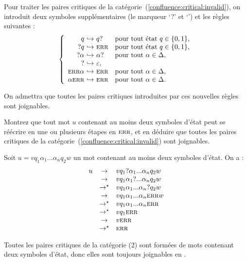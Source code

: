 \begin{exercice}
  Pour traiter les paires critiques de la catégorie~(\ref{confluence:critical:invalid}),
  on introduit deux symboles supplémentaires (le marqueur `?' et `\ERR{}') et les règles suivantes : 
  $$
  \left\{\begin{array}{r@{~\hookrightarrow~}ll}
  q   & q ?  & \text{pour tout état } q \in \{0,1\},\\
  ? q & \ERR & \text{pour tout état } q \in \{0,1\},\\
  ? \alpha & \alpha ? & \text{pour tout } \alpha\in\Delta,\\
  ? & \varepsilon,\\
  \ERR \alpha & \ERR & \text{pour tout } \alpha\in\Delta,\\
  \alpha \ERR & \ERR & \text{pour tout } \alpha\in\Delta.\\
  \end{array}\right.
  $$

  On admettra que toutes les paires critiques introduites par ces nouvelles règles sont joignables.

  \begin{question}
  \item Montrez que tout mot $u$ contenant au moins deux symboles d'état peut se réécrire en une ou plusieurs étapes en $\textsc{err}$,
    et en déduire que toutes les paires critiques de la catégorie~(\ref{confluence:critical:invalid}) sont joignables.
  \end{question}
  \begin{correction}
    Soit $u = v q_1 \alpha_1 ... \alpha_n q_2 w$ un mot contenant au moins deux symboles d'état. On a :
    $$
    \begin{array}{rcl}
      u &\rightarrow& v q_1 ? \alpha_1 ... \alpha_n q_2 w \\
      &\rightarrow& v q_1 \alpha_1 ? ... \alpha_n q_2 w \\
      &\rightarrow^\star& v q_1 \alpha_1 ... \alpha_n ? q_2 w \\
      &\rightarrow& v q_1 \alpha_1 ... \alpha_n \textsc{err} w \\
      &\rightarrow^\star& v q_1 \alpha_1 ... \alpha_n \textsc{err} \\
      &\rightarrow^\star& v q_1 \textsc{err} \\
      &\rightarrow& v \textsc{err} \\
      &\rightarrow^\star& \textsc{err}
    \end{array}
    $$

    Toutes les paires critiques de la catégorie (2) sont formées de mots contenant deux symboles d'état, donc elles sont toujours joignables en \ERR. 
  \end{correction}


\end{exercice}
